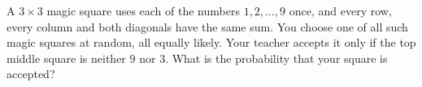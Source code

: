 A $3\times3$ magic square uses each of the numbers $1,2,\dots,9$ once, and every row, every column and both diagonals have the same sum. You choose one of all such magic squares at random, all equally likely. Your teacher accepts it only if the top middle square is neither $9$ nor $3$. What is the probability that your square is accepted?
